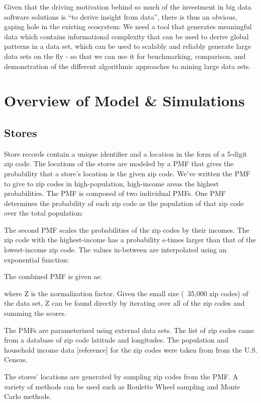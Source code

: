 \documentclass[conference]{IEEEtran}
\begin{document}
Given that the driving motivation behind so much of the investment in big data software solutions is “to derive insight from data”, there is thus an obvious, gaping hole in the existing ecosystem: We need a tool that generates meaningful data which contains informational complexity that can be used to derive global patterns in a data set, which can be used to scalably and reliably generate large data sets on the fly - so that we can use it for benchmarking, comparison, and demonstration of the different algorithmic approaches to mining large data sets.

\section{Overview of Model \& Simulations}

\subsection{Stores}


Store records contain a unique identifier and a location in the form of a 5-digit zip code.  The locations of the stores are modeled by a PMF that gives the probability that a store’s location is the given zip code. We’ve written the PMF to give to zip codes in high-population, high-income areas the highest probabilities. The PMF is composed of two individual PMFs. One PMF determines the probability of each zip code as the population of that zip code over the total population:

The second PMF scales the probabilities of the zip codes by their incomes.  The zip code with the highest-income has a probability s-times larger than that of the lowest-income zip code. The values in-between are interpolated using an exponential function:

The combined PMF is given as: 

where Z is the normalization factor.  Given the small size (~35,000 zip codes) of the data set, Z can be found directly by iterating over all of the zip codes and summing the scores.

The PMFs are parameterized using external data sets.  The list of zip codes came from a database of zip code latitude and longitudes.  The population and household income data [reference] for the zip codes were taken from from the U.S. Census. 

The stores' locations are generated by sampling zip codes from the PMF.  A variety of methods can be used such as Roulette Wheel sampling and Monte Carlo methods.
\end{document}
